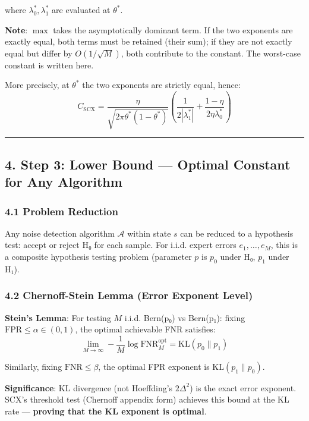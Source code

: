 \documentclass[
  12pt,
]{article}
\begin{document}
where \(\lambda_0^*, \lambda_1^*\) are evaluated at \(\theta^*\).

\textbf{Note}: \(\max\) takes the asymptotically dominant term. If the two exponents are exactly equal, both terms must be retained (their sum); if they are not exactly equal but differ by \(O(1/\sqrt{M})\), both contribute to the constant. The worst-case constant is written here.

More precisely, at \(\theta^*\) the two exponents are strictly equal, hence:
\[C_{\text{SCX}} = \frac{\eta}{\sqrt{2\pi\theta^*(1-\theta^*)}} \left(\frac{1}{2|\lambda_1^*|} + \frac{1-\eta}{2\eta\lambda_0^*}\right)\]

\begin{center}\rule{0.5\linewidth}{0.5pt}\end{center}

\subsection{4. Step 3: Lower Bound — Optimal Constant for Any Algorithm}\label{step-3-lower-bound-optimal-constant-for-any-algorithm}

\subsubsection{4.1 Problem Reduction}\label{problem-reduction}

Any noise detection algorithm \(\mathcal{A}\) within state \(s\) can be reduced to a hypothesis test: accept or reject H₀ for each sample. For i.i.d. expert errors \(e_1, \dots, e_M\), this is a composite hypothesis testing problem (parameter \(p\) is \(p_0\) under H₀, \(p_1\) under H₁).

\subsubsection{4.2 Chernoff-Stein Lemma (Error Exponent Level)}\label{chernoff-stein-lemma-error-exponent-level}

\textbf{Stein's Lemma}: For testing \(M\) i.i.d. Bern(p₀) vs Bern(p₁): fixing \(\text{FPR} \leq \alpha \in (0,1)\), the optimal achievable FNR satisfies:
\[\lim_{M\to\infty} -\frac{1}{M}\log \text{FNR}_M^{\text{opt}} = \text{KL}(p_0 \| p_1)\]

Similarly, fixing \(\text{FNR} \leq \beta\), the optimal FPR exponent is \(\text{KL}(p_1 \| p_0)\).

\textbf{Significance}: KL divergence (not Hoeffding's \(2\Delta^2\)) is the exact error exponent. SCX's threshold test (Chernoff appendix form) achieves this bound at the KL rate — \textbf{proving that the KL exponent is optimal}.
\end{document}
